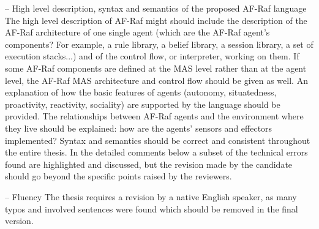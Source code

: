 \documentclass{article}
\newenvironment{them}{\noindent\begingroup\color{blue}}{\endgroup\par}
\begin{document}
\begin{them}
\begin{them}
\end{them}
\begin{them}
-- High level description, syntax and semantics of the proposed AF-Raf language
The high level description of AF-Raf might should include the description of the AF-Raf architecture of one single agent (which are the AF-Raf agent's components? For example, a rule library, a belief library, a session library, a set of execution stacks...) and of the control flow, or interpreter, working on them. If some AF-Raf components are defined at the MAS level rather than at the agent level, the AF-Raf MAS architecture and control flow should be given as well.
An explanation of how the basic features of agents (autonomy, situatedness, proactivity, reactivity, sociality) are supported by the language should be provided. The relationships between AF-Raf agents and the environment where they live should be explained: how are the agents' sensors and effectors implemented? Syntax and semantics should be correct and consistent throughout the entire thesis. In the detailed comments below a subset of the technical errors found are highlighted and discussed, but the revision made by the candidate should go beyond the specific points raised by the reviewers.
\end{them}
\begin{them}
-- Fluency
The thesis requires a revision by a native English speaker, as many typos and involved sentences were found which should be removed in the final version.
\end{them}


\end{them}
\end{document}
